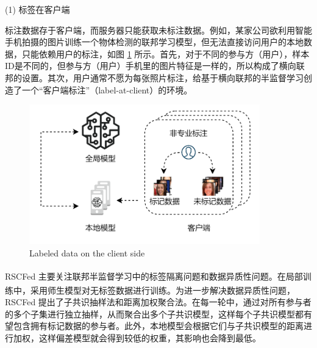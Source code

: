 (1) 标签在客户端

标注数据存于客户端，而服务器只能获取未标注数据。例如，某家公司欲利用智能手机拍摄的图片训练一个物体检测的联邦学习模型，但无法直接访问用户的本地数据，只能依赖用户的标注，如图 \ref{LabelAtClient} 所示。首先，对于不同的参与方（用户），样本ID是不同的，但参与方（用户）手机里的图片特征是一样的，所以构成了横向联邦的设置。其次，用户通常不愿为每张照片标注，给基于横向联邦的半监督学习创造了一个“客户端标注”（label-at-client）的环境。

\begin{figure}[h] %
	\centering %
	\includegraphics[width=10cm]{chapters/imgs/LabelAtClient} %
	{\wuhao Labeled data on the client side} %
	\label{LabelAtClient} %
\end{figure} %

RSCFed\textsuperscript{\cite{liang2022rscfed}} 主要关注联邦半监督学习中的标签隔离问题和数据异质性问题。在局部训练中，采用师生模型\textsuperscript{\cite{tarvainen2017mean}}对无标签数据进行训练。为进一步解决数据异质性问题，RSCFed 提出了子共识抽样法和距离加权聚合法。在每一轮中，通过对所有参与者的多个子集进行独立抽样，从而聚合出多个子共识模型，这样每个子共识模型都有望包含拥有标记数据的参与者。此外，本地模型会根据它们与子共识模型的距离进行加权，这样偏差模型就会得到较低的权重，其影响也会降到最低。

